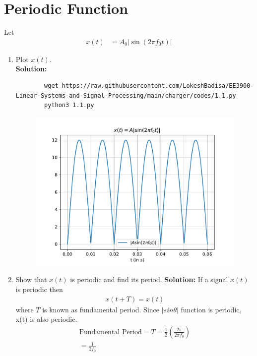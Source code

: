 \documentclass[journal,12pt,twocolumn]{IEEEtran}
\newcommand{\solution}{\noindent \textbf{Solution: }}
\providecommand{\brak}[1]{\ensuremath{\left(#1\right)}}
\providecommand{\abs}[1]{\left\vert#1\right\vert}
\numberwithin{equation}{section}
\renewcommand\thesection{\arabic{section}}
\begin{document}
    \section{Periodic Function}
    Let 
    \begin{align}
        x(t) &= A_0\abs{\sin\brak{2\pi f_0 t}}
        \label{eq:10-orig-diff-def}
    \end{align}
    \begin{enumerate}[label=\thesection.\arabic*
    ,ref=\thesection.\theenumi]
    \item Plot $x(t)$.\\
    \solution 
    \begin{lstlisting}
        wget https://raw.githubusercontent.com/LokeshBadisa/EE3900-Linear-Systems-and-Signal-Processing/main/charger/codes/1.1.py
        python3 1.1.py
    \end{lstlisting}
    \begin{figure}[!ht]
			\centering
			\includegraphics[width=\columnwidth]{./figs/1.1}
			\caption{}
\end{figure}
    \item Show that $x(t)$ is periodic and find its period.
    \solution 
    If a signal $x(t)$ is periodic then
    \begin{align}
    x(t+T)=x(t)
    \end{align}
    where $T$ is known as fundamental period.
    \indent Since $|sin\theta|$ function is periodic, x(t) is also periodic.
    \begin{align}
\text{Fundamental Period}=T=\frac{1}{2}\brak{\frac{2 \pi}{2 \pi f_0}}\\
\label{eq:ftp}
=\frac{1}{2f_0}
    \end{align}
    \end{enumerate}
\end{document}
